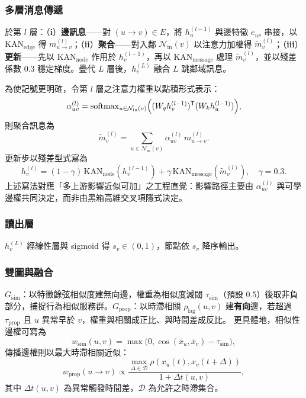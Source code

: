 \documentclass[conference]{IEEEtran}
\begin{document}
\subsubsection{多層消息傳遞}
於第 $l$ 層：（\textbf{i}）\textbf{邊訊息}——對 $(u\!\to\! v)\in E$，將 $h_u^{(l-1)}$ 與邊特徵 $e_{uv}$ 串接，以 $\mathrm{KAN}_{\mathrm{edge}}$ 得 $m_{u\to v}^{(l)}$；（\textbf{ii}）\textbf{聚合}——對入鄰 $\mathcal{N}_{\mathrm{in}}(v)$ 以注意力加權得 $\tilde{m}_v^{(l)}$；（\textbf{iii}）\textbf{更新}——先以 $\mathrm{KAN}_{\mathrm{node}}$ 作用於 $h_v^{(l-1)}$，再以 $\mathrm{KAN}_{\mathrm{message}}$ 處理 $\tilde{m}_v^{(l)}$，並以殘差係數 $0.3$ 穩定梯度。疊代 $L$ 層後，$h_v^{(L)}$ 融合 $L$ 跳鄰域訊息。



為使記號更明確，令第 $l$ 層之注意力權重以點積形式表示：
\begin{equation}
\alpha_{uv}^{(l)} = \mathrm{softmax}_{u\in\mathcal{N}_{\mathrm{in}}(v)}\Bigl( (W_q h_v^{(l-1)})^{\mathsf{T}} (W_k h_u^{(l-1)}) \Bigr),
\end{equation}
則聚合訊息為
\begin{equation}
\tilde{m}_v^{(l)} = \sum_{u\in\mathcal{N}_{\mathrm{in}}(v)} \alpha_{uv}^{(l)}\, m_{u\to v}^{(l)}.
\end{equation}
更新步以殘差型式寫為
\begin{equation}
h_v^{(l)} = (1-\gamma)\,\mathrm{KAN}_{\mathrm{node}}(h_v^{(l-1)}) + \gamma\,\mathrm{KAN}_{\mathrm{message}}(\tilde{m}_v^{(l)}), \quad \gamma=0.3.
\end{equation}
上述寫法對應「多上游影響近似可加」之工程直覺：影響路徑主要由 $\alpha_{uv}^{(l)}$ 與可學邊權共同決定，而非由黑箱高維交叉項隱式決定。

\subsubsection{讀出層}
$h_v^{(L)}$ 經線性層與 sigmoid 得 $s_v\in(0,1)$，節點依 $s_v$ 降序輸出。

\subsubsection{雙圖與融合}
\textbf{$G_{\mathrm{sim}}$}：以特徵餘弦相似度建無向邊，權重為相似度減閾 $\tau_{\mathrm{sim}}$（預設 $0.5$）後取非負部分，捕捉行為相似服務群。\textbf{$G_{\mathrm{prop}}$}：以時滯相關 $\rho_{\mathrm{lag}}(u,v)$ 建\textbf{有向}邊，若超過 $\tau_{\mathrm{prop}}$ 且 $u$ 異常早於 $v$，權重與相關成正比、與時間差成反比。
更具體地，相似性邊權可寫為
\begin{equation}
w_{\mathrm{sim}}(u,v)=\max\bigl(0,\cos(\bar{x}_u,\bar{x}_v)-\tau_{\mathrm{sim}}\bigr),
\end{equation}
傳播邊權則以最大時滯相關近似：
\begin{equation}
w_{\mathrm{prop}}(u\to v)\propto \frac{\max_{\Delta\in\mathcal{D}}\rho(x_u(t),x_v(t+\Delta))}{1+\Delta t(u,v)},
\end{equation}
其中 $\Delta t(u,v)$ 為異常觸發時間差，$\mathcal{D}$ 為允許之時滯集合。
\end{document}
